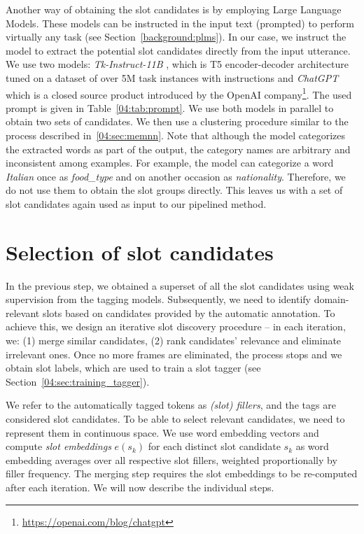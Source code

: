 Another way of obtaining the slot candidates is by employing Large Language Models.
These models can be instructed in the input text (prompted) to perform virtually any task (see Section~\ref{background:plms}).
In our case, we instruct the model to extract the potential slot candidates directly from the input utterance.
We use two models: \emph{Tk-Instruct-11B} \cite{supernaturalinstructions}, which is T5 encoder-decoder architecture \cite{2020t5} tuned on a dataset of over 5M task instances with instructions and \emph{ChatGPT} which is a closed source product introduced by the OpenAI company\footnote{\url{https://openai.com/blog/chatgpt}}.
The used prompt is given in Table~\ref{04:tab:prompt}.
We use both models in parallel to obtain two sets of candidates.
We then use a clustering procedure similar to the process described in~\ref{04:sec:memnn}.
Note that although the model categorizes the extracted words as part of the output, the category names are arbitrary and inconsistent among examples.
For example, the model can categorize a word \emph{Italian} once as \textit{food\_type} and on another occasion as \emph{nationality}.
Therefore, we do not use them to obtain the slot groups directly.
This leaves us with a set of slot candidates again used as input to our pipelined method.

\section{Selection of slot candidates}
\label{04:sec:candidate_selection}
In the previous step, we obtained a superset of all the slot candidates using weak supervision from the tagging models.
Subsequently, we need to identify domain-relevant slots based on candidates provided by the automatic annotation.
To achieve this, we design an iterative slot discovery procedure -- in each iteration, we: 
(1) merge similar candidates, 
(2) rank candidates' relevance and eliminate irrelevant ones.
Once no more frames are eliminated, the process stops and we obtain slot labels, which are used to train a slot tagger (see Section~\ref{04:sec:training_tagger}).

We refer to the automatically tagged tokens as \emph{(slot) fillers}, and the tags are considered slot candidates.
To be able to select relevant candidates, we need to represent them in continuous space.
We use word embedding vectors and compute \emph{slot embeddings} $e(s_k)$ for each 
distinct slot candidate $s_k$ as word embedding averages over all respective slot fillers, weighted proportionally by filler frequency.
The merging step requires the slot embeddings to be re-computed after each iteration.
We will now describe the individual steps.

